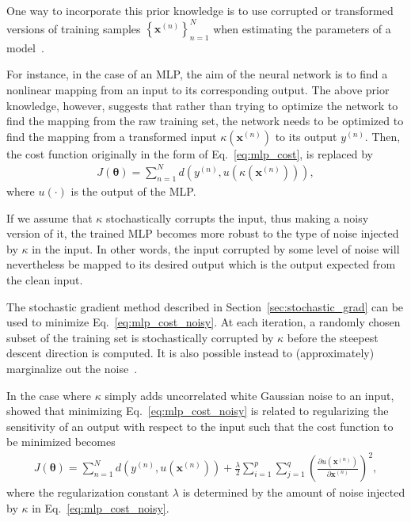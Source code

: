 \documentclass{now}
\newcommand{\vect}[1]{\mathbf{#1}}
\newcommand{\vects}[1]{\boldsymbol{#1}}
\newcommand{\vx}[0]{\vect{x}}
\newcommand{\TT}[0]{{\vects{\theta}}}
\begin{document}
One way to incorporate this prior knowledge is to use corrupted or transformed
versions of training samples $\left\{ \vx^{(n)} \right\}_{n=1}^N$ when
estimating the parameters of a model~\citep[see, e.g.,][Chapter
5.5]{Bishop2006}. 

For instance, in the case of an MLP, the aim of the neural network is to find a
nonlinear mapping from an input to its corresponding output. The above prior
knowledge, however, suggests that rather than trying to optimize the network to
find the mapping from the raw training set, the network needs to be optimized to
find the mapping from a transformed input $\kappa(\vx^{(n)})$ to its output
$y^{(n)}$. Then, the cost function originally in the form of
Eq.~\eqref{eq:mlp_cost}, is replaced by
\begin{align}
    \label{eq:mlp_cost_noisy}
    J(\TT) = \sum_{n=1}^N d\left(y^{(n)}, u(\kappa(\vx^{(n)}))\right),
\end{align}
where $u(\cdot)$ is the output of the MLP.

If we assume that $\kappa$ stochastically corrupts the input, thus making a
noisy version of it, the trained MLP becomes more robust to the type of noise
injected by $\kappa$ in the input.  In other words, the input corrupted by some
level of noise will nevertheless be mapped to its desired output which is the
output expected from the clean input. 

The stochastic gradient method described in Section~\ref{sec:stochastic_grad}
can be used to minimize Eq.~\eqref{eq:mlp_cost_noisy}. At each iteration, a
randomly chosen subset of the training set is stochastically corrupted by
$\kappa$ before the steepest descent direction is computed. It is also possible
instead to (approximately) marginalize out the
noise~\citep{Maaten2013,Chen2014}.

In the case where $\kappa$ simply adds uncorrelated white Gaussian noise to an
input, \citet{Bishop1995} showed that minimizing Eq.~\eqref{eq:mlp_cost_noisy}
is related to regularizing the sensitivity of an output with respect to the
input such that the cost function to be minimized becomes
\begin{align}
    \label{eq:noise_injection_reg}
    J(\TT) = \sum_{n=1}^N d\left(y^{(n)}, u(\vx^{(n)})\right) +
    \frac{\lambda}{2} \sum_{i=1}^p \sum_{j=1}^q \left( \frac{\partial
        u(\vx^{(n)})}{\partial \vx^{(n)}}\right)^2,
\end{align}
where the regularization constant $\lambda$ is determined by the amount of noise
injected by $\kappa$ in Eq.~\eqref{eq:mlp_cost_noisy}.
\end{document}
